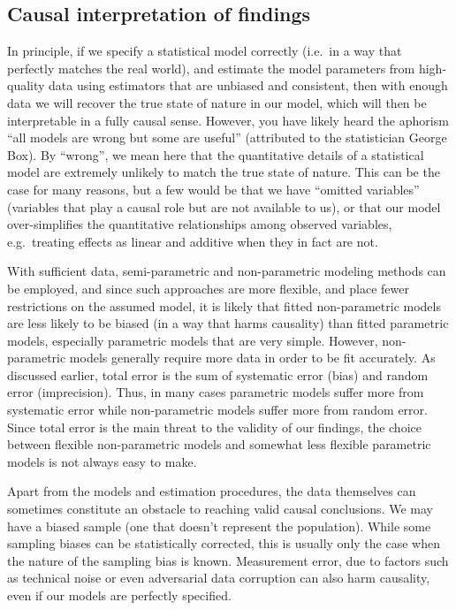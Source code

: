 \subsection{Causal interpretation of findings}

In principle, if we specify a statistical model correctly (i.e.\ in a way that perfectly matches the real world), and estimate the model parameters from high-quality data using estimators that are unbiased and consistent, then with enough data we will recover the true state of nature in our model, which will then be interpretable in a fully causal sense.  However, you have likely heard the aphorism ``all models are wrong but some are useful'' (attributed to the statistician George Box).  By ``wrong'', we mean here that the quantitative details of a statistical model are extremely unlikely to match the true state of nature.  This can be the case for many reasons, but a few would be that we have ``omitted variables'' (variables that play a causal role but are not available to us), or that our model over-simplifies the quantitative relationships among observed variables, e.g.\ treating effects as linear and additive when they in fact are not.

With sufficient data, semi-parametric and non-parametric modeling methods can be employed, and since such approaches are more flexible, and place fewer restrictions on the assumed model, it is likely that fitted non-parametric models are less likely to be biased (in a way that harms causality) than fitted parametric models, especially parametric models that are very simple.  However, non-parametric models generally require more data in order to be fit accurately.  As discussed earlier, total error is the sum of systematic error (bias) and random error (imprecision).  Thus, in many cases parametric models suffer more from systematic error while non-parametric models suffer more from random error.  Since total error is the main threat to the validity of our findings, the choice between flexible non-parametric models and somewhat less flexible parametric models is not always easy to make.

Apart from the models and estimation procedures, the data themselves can sometimes constitute an obstacle to reaching valid causal conclusions.  We may have a biased sample (one that doesn't represent the population).  While some sampling biases can be statistically corrected, this is usually only the case when the nature of the sampling bias is known.  Measurement error, due to factors such as technical noise or even adversarial data corruption can also harm causality, even if our models are perfectly specified.

